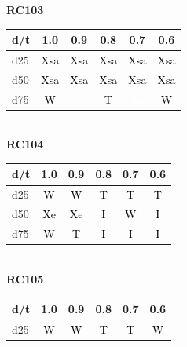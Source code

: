 \begin{figure}[p]
\textbf{RC103}\\[-0.4em]
\begin{tabular}{lccccc}
\toprule
d/t & 1.0 & 0.9 & 0.8 & 0.7 & 0.6 \\
\midrule
d25 & \cellcolor{excludedBlue}\textcolor{black}{Xsa} & \cellcolor{excludedBlue}\textcolor{black}{Xsa} & \cellcolor{excludedBlue}\textcolor{black}{Xsa} & \cellcolor{excludedBlue}\textcolor{black}{Xsa} & \cellcolor{excludedBlue}\textcolor{black}{Xsa} \\
d50 & \cellcolor{excludedBlue}\textcolor{black}{Xsa} & \cellcolor{excludedBlue}\textcolor{black}{Xsa} & \cellcolor{excludedBlue}\textcolor{black}{Xsa} & \cellcolor{excludedBlue}\textcolor{black}{Xsa} & \cellcolor{excludedBlue}\textcolor{black}{Xsa} \\
d75 & \cellcolor{worseRed}\textcolor{black}{W} & \cellcolor{excludedBlack}\textcolor{white}{Xn} & \cellcolor{tieGray}\textcolor{black}{T} & \cellcolor{excludedBlack}\textcolor{white}{Xn} & \cellcolor{worseRed}\textcolor{black}{W} \\
\bottomrule
\end{tabular}\\[0.8em]
\textbf{RC104}\\[-0.4em]
\begin{tabular}{lccccc}
\toprule
d/t & 1.0 & 0.9 & 0.8 & 0.7 & 0.6 \\
\midrule
d25 & \cellcolor{worseRed}\textcolor{black}{W} & \cellcolor{worseRed}\textcolor{black}{W} & \cellcolor{tieGray}\textcolor{black}{T} & \cellcolor{tieGray}\textcolor{black}{T} & \cellcolor{tieGray}\textcolor{black}{T} \\
d50 & \cellcolor{excludedBrown}\textcolor{black}{Xe} & \cellcolor{excludedBrown}\textcolor{black}{Xe} & \cellcolor{improvedGreen}\textcolor{black}{I} & \cellcolor{worseRed}\textcolor{black}{W} & \cellcolor{improvedGreen}\textcolor{black}{I} \\
d75 & \cellcolor{worseRed}\textcolor{black}{W} & \cellcolor{tieGray}\textcolor{black}{T} & \cellcolor{improvedGreen}\textcolor{black}{I} & \cellcolor{improvedGreen}\textcolor{black}{I} & \cellcolor{improvedGreen}\textcolor{black}{I} \\
\bottomrule
\end{tabular}\\[0.8em]
\textbf{RC105}\\[-0.4em]
\begin{tabular}{lccccc}
\toprule
d/t & 1.0 & 0.9 & 0.8 & 0.7 & 0.6 \\
\midrule
d25 & \cellcolor{worseRed}\textcolor{black}{W} & \cellcolor{worseRed}\textcolor{black}{W} & \cellcolor{tieGray}\textcolor{black}{T} & \cellcolor{tieGray}\textcolor{black}{T} & \cellcolor{worseRed}\textcolor{black}{W} \\

\end{tabular}
\end{figure}

